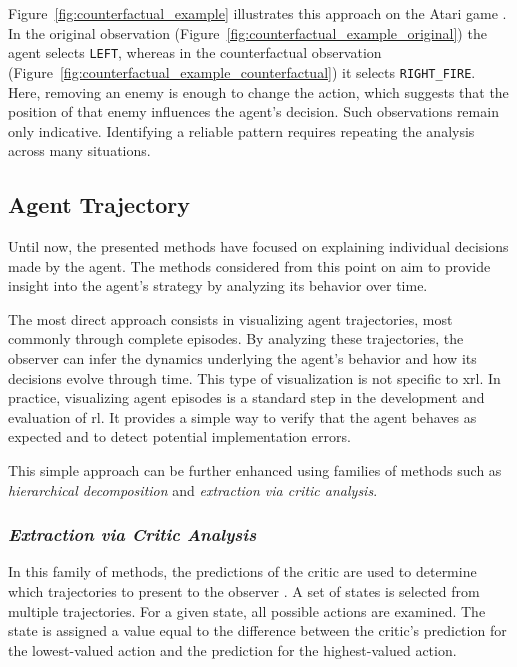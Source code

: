 Figure~\ref{fig:counterfactual_example} illustrates this approach on the Atari game \SpaceInvadersName \parencite{olson2021counterfactual}.
In the original observation (Figure~\ref{fig:counterfactual_example_original}) the agent selects \texttt{LEFT}, whereas in the counterfactual observation (Figure~\ref{fig:counterfactual_example_counterfactual}) it selects \texttt{RIGHT\_FIRE}.
Here, removing an enemy is enough to change the action, which suggests that the position of that enemy influences the agent's decision.
Such observations remain only indicative. Identifying a reliable pattern requires repeating the analysis across many situations.



\subsection{Agent Trajectory}
\label{subsec:agent_trajectory}

Until now, the presented methods have focused on explaining individual decisions made by the agent.
The methods considered from this point on aim to provide insight into the agent's strategy by analyzing its behavior over time.

The most direct approach consists in visualizing agent trajectories, most commonly through complete episodes.
By analyzing these trajectories, the observer can infer the dynamics underlying the agent's behavior and how its decisions evolve through time.
This type of visualization is not specific to \gls{xrl}.
In practice, visualizing agent episodes is a standard step in the development and evaluation of \gls{rl}.
It provides a simple way to verify that the agent behaves as expected and to detect potential implementation errors.

This simple approach can be further enhanced using families of methods such as \textit{hierarchical decomposition} and \textit{extraction via critic analysis}.

\subsubsection{\textit{Extraction via Critic Analysis}}
\label{subsubsec:extraction_via_critic_analysis}

In this family of methods, the predictions of the critic are used to determine which trajectories to present to the observer \parencite{Sequeira_2020}.
A set of states is selected from multiple trajectories.
For a given state, all possible actions are examined.
The state is assigned a value equal to the difference between the critic's prediction for the lowest-valued action and the prediction for the highest-valued action.

